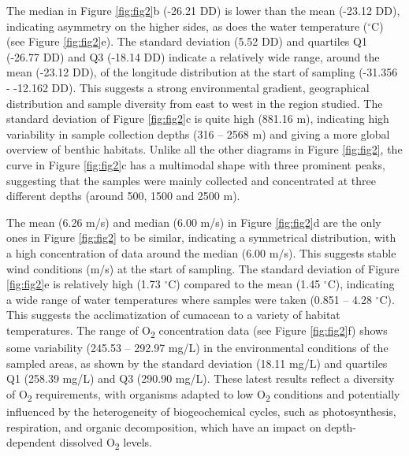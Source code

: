 The median in Figure \ref{fig:fig2}b (-26.21 DD) is lower than the mean (-23.12 DD), indicating asymmetry on the higher sides, as does the water temperature ($^\circ$C) (see Figure \ref{fig:fig2}e). The standard deviation (5.52 DD) and quartiles Q1 (-26.77 DD) and Q3 (-18.14 DD) indicate a relatively wide range, around the mean (-23.12 DD), of the longitude distribution at the start of sampling (-31.356 - -12.162 DD). This suggests a strong environmental gradient, geographical distribution and sample diversity from east to west in the region studied. The standard deviation of Figure \ref{fig:fig2}c is quite high (881.16 m), indicating high variability in sample collection depths (316 – 2568 m) and giving a more global overview of benthic habitats. Unlike all the other diagrams in Figure \ref{fig:fig2}, the curve in Figure \ref{fig:fig2}c has a multimodal shape with three prominent peaks, suggesting that the samples were mainly collected and concentrated at three different depths (around 500, 1500 and 2500 m).

The mean (6.26 m/s) and median (6.00 m/s) in Figure \ref{fig:fig2}d are the only ones in Figure \ref{fig:fig2} to be similar, indicating a symmetrical distribution, with a high concentration of data around the median (6.00 m/s). This suggests stable wind conditions (m/s) at the start of sampling. The standard deviation of Figure \ref{fig:fig2}e is relatively high (1.73 $^\circ$C) compared to the mean (1.45 $^\circ$C), indicating a wide range of water temperatures where samples were taken (0.851 – 4.28 $^\circ$C). This suggests the acclimatization of cumacean to a variety of habitat temperatures. The range of O\textsubscript{2} concentration data (see Figure \ref{fig:fig2}f) shows some variability (245.53 – 292.97 mg/L) in the environmental conditions of the sampled areas, as shown by the standard deviation (18.11 mg/L) and quartiles Q1 (258.39 mg/L) and Q3 (290.90 mg/L). These latest results reflect a diversity of O\textsubscript{2} requirements, with organisms adapted to low O\textsubscript{2} conditions and potentially influenced by the heterogeneity of biogeochemical cycles, such as photosynthesis, respiration, and organic decomposition, which have an impact on depth-dependent dissolved  O\textsubscript{2} levels.

